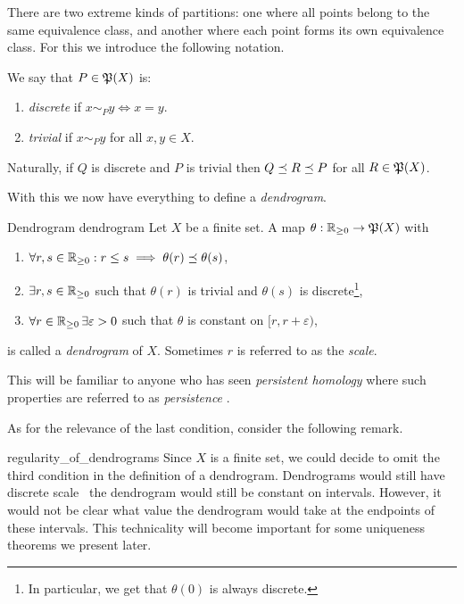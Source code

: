 There are two extreme kinds of partitions: one where all points belong to the same equivalence class, and another where each point forms its own equivalence class. For this we introduce the following notation.

\begin{definition}{}{}
We say that $P \in \P(X)$ is:
\begin{enumerate}
    \item \emph{discrete} if $x \sim_P y \iff x = y$.
    \item \emph{trivial} if $x \sim_P y$ for all $x,y \in X$.
\end{enumerate}
\end{definition}

Naturally, if $Q$ is discrete and $P$ is trivial then $Q \refines R \refines P$ for all $R \in \P(X)$.

With this we now have everything to define a \emph{dendrogram}.

\begin{definition}{Dendrogram \cite[Def.~2.2]{Carlsson2010}}{dendrogram}
Let $X$ be a finite set. A map $\theta: \R_{\geq0} \to \mathfrak{P}(X)$ with
\begin{enumerate}
    \item $\forall r,s \in \R_{\geq0}: r \leq s \implies  \theta(r) \refines \theta(s)$,
    \item $\exists r,s \in \R_{\geq0}$ such that $\theta(r)$ is trivial and $\theta(s)$ is discrete\footnote{In particular, we get that $\theta(0)$ is always discrete.},
    \item $\forall r \in \R_{\geq0} \,\exists \varepsilon > 0$ such that $\theta$ is constant on $[r, r + \varepsilon)$,
\end{enumerate}
is called a \emph{dendrogram} of $X$. Sometimes $r$ is referred to as the \emph{scale}.
\end{definition}

This will be familiar to anyone who has seen \emph{persistent homology} where such properties are referred to as \emph{persistence} \cite[Chap.~3]{Carlsson2014}.

As for the relevance of the last condition, consider the following remark.

\begin{myremark}{}{regularity_of_dendrograms}
Since $X$ is a finite set, we could decide to omit the third condition in the definition of a dendrogram.
Dendrograms would still have discrete scale \ie\ the dendrogram would still be constant on intervals.
However, it would not be clear what value the dendrogram would take at the endpoints of these intervals.
This technicality will become important for some uniqueness theorems we present later.
\end{myremark}

